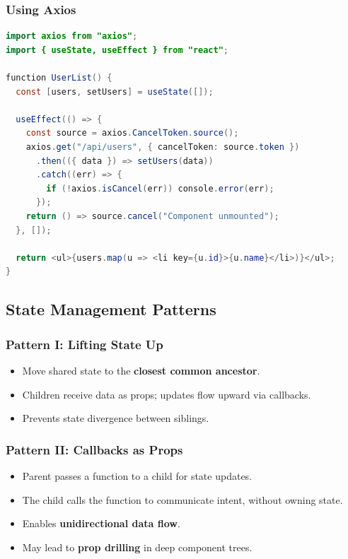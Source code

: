 \documentclass[hidelinks]{article}
\begin{document}
\subsubsection{Using Axios}
\begin{lstlisting}[language=Java, caption={Data fetching with Axios}]
import axios from "axios";
import { useState, useEffect } from "react";

function UserList() {
  const [users, setUsers] = useState([]);

  useEffect(() => {
    const source = axios.CancelToken.source();
    axios.get("/api/users", { cancelToken: source.token })
      .then(({ data }) => setUsers(data))
      .catch((err) => {
        if (!axios.isCancel(err)) console.error(err);
      });
    return () => source.cancel("Component unmounted");
  }, []);

  return <ul>{users.map(u => <li key={u.id}>{u.name}</li>)}</ul>;
}
\end{lstlisting}

\subsection{State Management Patterns}

\subsubsection{Pattern I: Lifting State Up}
\begin{itemize}
  \item Move shared state to the \textbf{closest common ancestor}.
  \item Children receive data as props; updates flow upward via callbacks.
  \item Prevents state divergence between siblings.
\end{itemize}

\subsubsection{Pattern II: Callbacks as Props}
\begin{itemize}
  \item Parent passes a function to a child for state updates.
  \item The child calls the function to communicate intent, without owning state.
  \item Enables \textbf{unidirectional data flow}.
  \item May lead to \textbf{prop drilling} in deep component trees.
\end{itemize}
\end{document}
